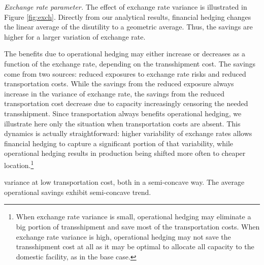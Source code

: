 \documentclass[mnsc,nonblindrev,copyedit]{informs2_wz} %
\begin{document}
{\noindent \em Exchange rate parameter.} The effect of exchange rate variance is illustrated in Figure \ref{fig:exch}.  Directly from our analytical results, financial hedging changes the linear average of the disutility to a geometric average.  Thus, the savings are higher for a larger variation of exchange rate.

The benefits due to operational hedging may either increase or decreases as a function of the exchange rate, depending on the transshipment cost.  The savings come from two sources: reduced exposures to exchange rate risks and reduced transportation costs.  While the savings from the reduced exposure always increase in the variance of exchange rate, the savings from the reduced transportation cost decrease due to capacity increasingly censoring the needed transshipment.  Since transportation always benefits operational hedging, we illustrate here only the situation when transportation costs are absent.  This dynamics is actually straightforward: higher variability of exchange rates allows financial hedging to capture a significant portion of that variability, while operational hedging results in production being shifted more often to cheaper location.\footnote{When exchange rate variance is small, operational hedging may eliminate a big portion of transshipment and save most of the transportation costs.  When exchange rate variance is high, operational hedging may not save the transshipment cost at all as it may be optimal to allocate all capacity to the domestic facility, as in the base case.}


 variance at low transportation cost, both in a semi-concave way. The average operational savings exhibit semi-concave trend.
\end{document}

